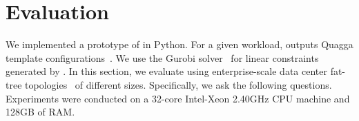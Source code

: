 \section{Evaluation}
 \label{sec:evaluation}
\begin{figure}
	\begin{center}
	\end{center} 
\end{figure}
 We implemented a prototype of \name in Python. 
 For a given workload, \name outputs Quagga template
 configurations~\cite{quagga}. 
 We use the Gurobi solver~\cite{gurobi} 
 for linear constraints generated by \name.
  In this section, we evaluate \Name using
enterprise-scale data
center fat-tree topologies~\cite{fattree} of different 
sizes. 
Specifically, we ask the following questions.
Experiments were conducted on a
32-core Intel-Xeon 2.40GHz CPU machine and
128GB of RAM.

